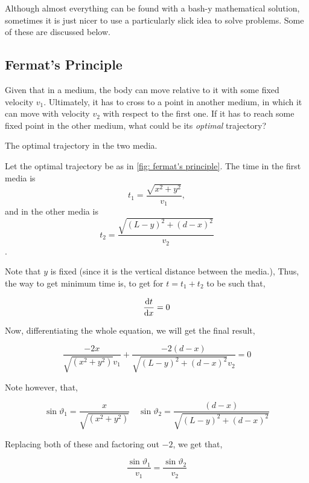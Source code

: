Although almost everything can be found with a bash-y mathematical solution, sometimes 
it is just nicer to use a particularly slick idea to solve problems. Some of these are discussed 
below.

\subsection{Fermat's Principle}

Given that in a medium, the body can move relative to it with some fixed 
velocity \(v_1\). Ultimately, it has to cross to a point in another medium, in which 
it can move with velocity \(v_2\) with respect to the first one. If it has to reach 
some fixed point in the other medium, what could be its \emph{optimal} trajectory?

\begin{marginfigure}
    \centering
    \caption{The optimal trajectory in the two media.}
    \label{fig: fermat's principle}
\end{marginfigure}

Let the optimal trajectory be as in \cref{fig: fermat's principle}. The time in the first media
is \[t_1 = \frac{\sqrt{x^2 + y^2}}{v_1},\] and in the other media is \[t_2 = \frac{\sqrt{(L-y)^2 + (d-x)^2}}{v_2}\].

Note that \(y\) is fixed (since it is the vertical distance between the media.), Thus, 
the way to get minimum time is, to get for \(t = t_1 + t_2\) to be such that,

\begin{equation*}
    \dv{t}{x} = 0
\end{equation*}

Now, differentiating the whole equation, we will get the final result,

\begin{equation}
    \frac{-2x}{\sqrt{(x^2+y^2)}v_1} + \frac{-2(d-x)}{\sqrt{(L-y)^2 + (d-x)^2}v_2} = 0 
\end{equation}

Note however, that, 

\begin{equation*}
    \sin\vartheta_1 = \frac{x}{\sqrt{(x^2+y^2)}} \quad \sin\vartheta_2 = \frac{(d-x)}{\sqrt{(L-y)^2 + (d-x)^2}}
\end{equation*}

Replacing both of these and factoring out \(-2\), we get that, 

\begin{equation}
    \boxed{\frac{\sin\vartheta_1}{v_1} = \frac{\sin\vartheta_2}{v_2}}
\end{equation}

